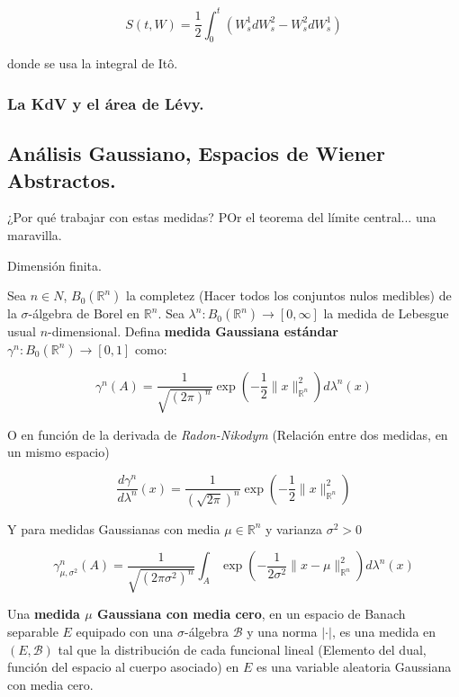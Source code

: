 \[
	S(t, W) = \frac{1}{2} \int_0^t (W_s^1 dW_s^2 - W_s^2 dW_s^1)
\]

donde se usa la integral de Itô.

\subsubsection{La KdV y el área de Lévy.}




\subsection{Análisis Gaussiano, Espacios de Wiener Abstractos.}



¿Por qué trabajar con estas medidas? POr el teorema del límite central... una maravilla.


Dimensión finita. 

\begin{boxDef}
	Sea $n \in N$, $B_0 (\mathbb{R}^n)$ la completez (Hacer todos los conjuntos nulos medibles) de la $\sigma$-álgebra de Borel en $\mathbb{R}^n$. Sea $\lambda^n: B_0 (\mathbb{R}^n) \rightarrow [0, \infty]$ la medida de Lebesgue usual $n$-dimensional. Defina \textbf{medida Gaussiana estándar} $\gamma^n: B_0 (\mathbb{R}^n) \rightarrow [0,1]$ como:

	\[
		\gamma^n (A) = \frac{1}{\sqrt{(2\pi)^n}} \exp \left( -\frac{1}{2} \lVert x \rVert_{\mathbb{R}^n}^2 \right) d \lambda^n (x)
	\]
\end{boxDef}

O en función de la derivada de \textit{Radon-Nikodym} (Relación entre dos medidas, en un mismo espacio)

\[
	\frac{d\gamma^n}{d\lambda^n} (x) = \frac{1}{(\sqrt{2\pi})^n} \exp\left( -\frac{1}{2} \lVert x \rVert_{\mathbb{R}^n}^2 \right)
\]

Y para medidas Gaussianas con media $\mu \in \mathbb{R}^n$ y varianza $\sigma^2 > 0$

\[
	\gamma_{\mu, \sigma^2}^n (A) = \frac{1}{\sqrt{(2\pi \sigma^2)^n}} \int_A \exp\left( -\frac{1}{2\sigma^2} \lVert x - \mu \rVert_{\mathbb{R}^n}^2 \right) d\lambda^n (x)
\]


\begin{boxDef}
	Una \textbf{medida $\mu$ Gaussiana con media cero}, en un espacio de Banach separable $E$ equipado con una $\sigma$-álgebra $\mathcal{B}$ y una norma $\lvert \cdot \rvert$, es una medida en $(E, \mathcal{B})$ tal que la distribución de cada funcional lineal (Elemento del dual, función del espacio al cuerpo asociado) en $E$ es una variable aleatoria Gaussiana con media cero.
\end{boxDef}



